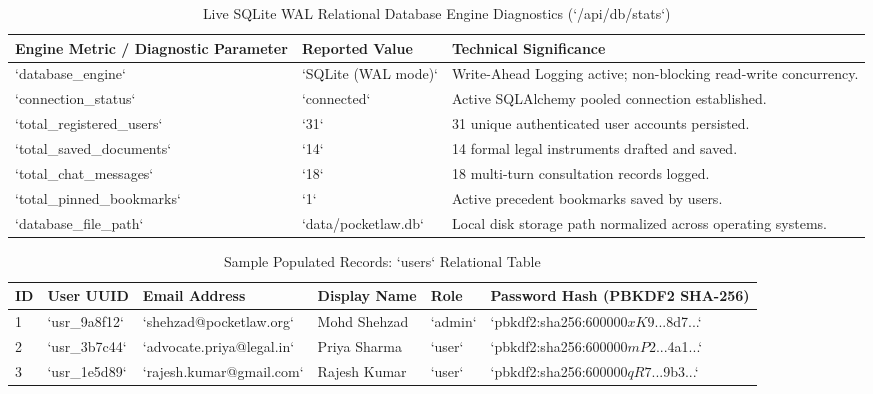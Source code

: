 \begin{table}[H]
\caption{Live SQLite WAL Relational Database Engine Diagnostics (`/api/db/stats`)}
\label{tab:db_live_stats}
\centering
\small
\begin{tabularx}{\textwidth}{p{5.5cm}p{4.0cm}X}
\toprule
\textbf{Engine Metric / Diagnostic Parameter} & \textbf{Reported Value} & \textbf{Technical Significance} \\
\midrule
`database_engine` & `SQLite (WAL mode)` & Write-Ahead Logging active; non-blocking read-write concurrency. \\
`connection_status` & `connected` & Active SQLAlchemy pooled connection established. \\
`total_registered_users` & `31` & 31 unique authenticated user accounts persisted. \\
`total_saved_documents` & `14` & 14 formal legal instruments drafted and saved. \\
`total_chat_messages` & `18` & 18 multi-turn consultation records logged. \\
`total_pinned_bookmarks` & `1` & Active precedent bookmarks saved by users. \\
`database_file_path` & `data/pocketlaw.db` & Local disk storage path normalized across operating systems. \\
\bottomrule
\end{tabularx}
\end{table}

\begin{table}[H]
\caption{Sample Populated Records: `users` Relational Table}
\label{tab:sample_users_data}
\centering
\scriptsize
\begin{tabularx}{\textwidth}{lllllX}
\toprule
\textbf{ID} & \textbf{User UUID} & \textbf{Email Address} & \textbf{Display Name} & \textbf{Role} & \textbf{Password Hash (PBKDF2 SHA-256)} \\
\midrule
1 & `usr_9a8f12` & `shehzad@pocketlaw.org` & Mohd Shehzad & `admin` & `pbkdf2:sha256:600000$xK9...$8d7...` \\
2 & `usr_3b7c44` & `advocate.priya@legal.in` & Priya Sharma & `user` & `pbkdf2:sha256:600000$mP2...$4a1...` \\
3 & `usr_1e5d89` & `rajesh.kumar@gmail.com` & Rajesh Kumar & `user` & `pbkdf2:sha256:600000$qR7...$9b3...` \\
\bottomrule
\end{tabularx}
\end{table}

